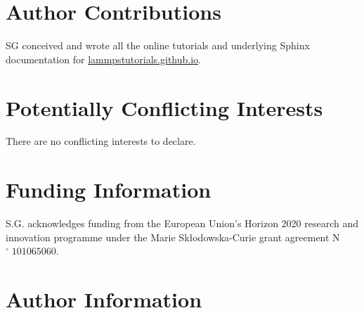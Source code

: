 \documentclass[9pt,tutorial]{livecoms}
\begin{document}
\section*{Author Contributions}

SG conceived and wrote all the online tutorials and underlying Sphinx documentation for \href{https://lammpstutorials.github.io}{lammpstutorials.github.io}.

\section*{Potentially Conflicting Interests}

There are no conflicting interests to declare.

\section*{Funding Information}

S.G. acknowledges funding from the European Union's Horizon 2020 research and innovation programme under the Marie Skłodowska-Curie grant agreement N$^\circ\;101065060$.

\section*{Author Information}
\makeorcid




\end{document}

